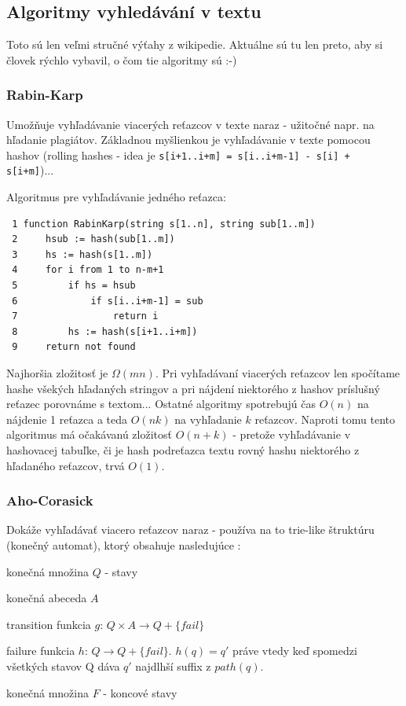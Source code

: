 \subsection{Algoritmy vyhledávání v textu}
Toto sú len veľmi stručné výťahy z wikipedie. Aktuálne sú tu len preto, aby si človek rýchlo vybavil, o čom tie algoritmy sú :-)

\subsubsection*{Rabin-Karp}
Umožňuje vyhľadávanie viacerých reťazcov v texte naraz - užitočné napr. na hľadanie plagiátov. Základnou myšlienkou je vyhľadávanie v texte pomocou hashov (rolling hashes - idea je \texttt{s[i+1..i+m] = s[i..i+m-1] - s[i] + s[i+m]})...

Algoritmus pre vyhľadávanie jedného reťazca:
\begin{verbatim}
 1 function RabinKarp(string s[1..n], string sub[1..m])
 2     hsub := hash(sub[1..m])
 3     hs := hash(s[1..m])
 4     for i from 1 to n-m+1
 5         if hs = hsub
 6             if s[i..i+m-1] = sub
 7                 return i
 8         hs := hash(s[i+1..i+m])
 9     return not found
\end{verbatim}

Najhoršia zložitosť je $\Omega(mn)$. Pri vyhľadávaní viacerých reťazcov len spočítame hashe všekých hľadaných stringov a pri nájdení niektorého z hashov príslušný reťazec porovnáme s textom... Ostatné algoritmy spotrebujú čas $O(n)$ na nájdenie 1 reťazca a teda $O(nk)$ na vyhľadanie $k$ reťazcov. Naproti tomu tento algoritmus má očakávanú zložitosť $O(n+k)$ - pretože vyhľadávanie v hashovacej tabuľke, či je hash podreťazca textu rovný hashu niektorého z hľadaného reťazcov, trvá $O(1)$.

\subsubsection*{Aho-Corasick}

Dokáže vyhľadávať viacero reťazcov naraz - používa na to trie-like štruktúru (konečný automat), ktorý obsahuje nasledujúce :
\begin{penumerate}
	\item konečná množina $Q$ - stavy
	\item konečná abeceda $A$
	\item transition funkcia $g$: $Q \times A \rightarrow Q + \{fail\}$
	\item failure funkcia $h$: $Q \rightarrow Q + \{fail\}$. $h(q)=q'$ práve vtedy keď spomedzi všetkých stavov Q dáva $q'$ najdlhší suffix z $path(q)$.
	\item konečná množina $F$ - koncové stavy
\end{penumerate}

